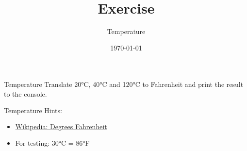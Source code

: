 


\title{Exercise}
\subtitle{Temperature}
\date{\today}




\begin{frame}
    \titlepage
\end{frame}

\begin{frame}{Temperature}
    Translate 20°C, 40°C and 120°C to Fahrenheit and print the result to the console.
\end{frame}

\begin{frame}{Temperature}
    Hints:
    \begin{itemize}
        \item \href{https://de.wikipedia.org/wiki/Grad_Fahrenheit}{Wikipedia: Degrees Fahrenheit}
        \item For testing: 30°C = 86°F
    \end{itemize}
\end{frame}



